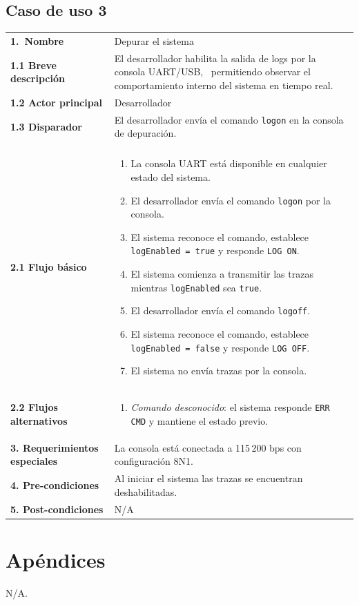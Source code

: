 \documentclass[11pt,a4paper]{article}
\makeatletter
\newcommand{\UseCaseTable}[9]{%
\begingroup
\renewcommand{\arraystretch}{1.2}
\noindent 
\rowcolors{3}{white}{white}%
\begin{tabularx}{\linewidth}{@{}|>{\raggedright\arraybackslash}p{4cm}|X|@{}}
\hline
\rowcolor[HTML]{0073A0}%
\multicolumn{2}{|c|}{\color{white}\bfseries #1}\\ \hline
\textbf{1.~Nombre} & #1\\ \hline
\textbf{1.1 Breve descripción} & #2\\ \hline
\textbf{1.2 Actor principal} & #3\\ \hline
\textbf{1.3 Disparador} & #4\\ \hline
\multicolumn{2}{|l|}{\textbf{2.~Flujo de eventos}} \\ \hline   %
\quad\textbf{2.1 Flujo básico} & #5\\ \hline
\quad\textbf{2.2 Flujos alternativos} & #6\\ \hline
\textbf{3. Requerimientos especiales} & #7\\ \hline
\textbf{4. Pre-condiciones} & #8\\ \hline
\textbf{5. Post-condiciones} & #9\\ \hline
\end{tabularx}
\endgroup
}
\makeatother
\begin{document}
\subsection{Caso de uso 3}
\UseCaseTable
  {Depurar el sistema} %
  {El desarrollador habilita la salida de logs por la consola UART/USB, \
permitiendo observar el comportamiento interno del sistema en tiempo real.} %
  {Desarrollador} %
  {El desarrollador envía el comando \texttt{logon} en la consola de depuración.} %
  {%
  \begin{enumerate}[leftmargin=*,nosep]
    \item La consola UART está disponible en cualquier estado del sistema.
    \item El desarrollador envía el comando \texttt{logon} por la consola.
    \item El sistema reconoce el comando, establece \texttt{logEnabled = true} y responde \texttt{LOG ON}.
    \item El sistema comienza a transmitir las trazas mientras \texttt{logEnabled} sea \texttt{true}.
    \item El desarrollador envía el comando \texttt{logoff}.
    \item El sistema reconoce el comando, establece \texttt{logEnabled = false} y responde \texttt{LOG OFF}.
    \item El sistema no envía trazas por la consola.
  \end{enumerate}}
  {%
  \begin{enumerate}[leftmargin=*,nosep]
    \item \textit{Comando desconocido}: el sistema responde \texttt{ERR CMD} y mantiene el estado previo.
  \end{enumerate}}
  {La consola está conectada a 115\,200 bps con configuración 8N1.} %
  {Al iniciar el sistema las trazas se encuentran deshabilitadas.} %
  {N/A} %

\section{Apéndices}

N/A.
\end{document}
